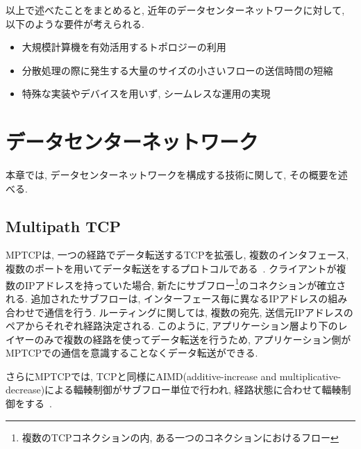 \documentclass[11pt, a4paper, twocolumn]{jsarticle}
\begin{document}
以上で述べたことをまとめると, 近年のデータセンターネットワークに対して, 以下のような要件が考えられる.
\begin{itemize}
  \item 大規模計算機を有効活用するトポロジーの利用
  \item 分散処理の際に発生する大量のサイズの小さいフローの送信時間の短縮
  \item 特殊な実装やデバイスを用いず, シームレスな運用の実現
\end{itemize}

\section{データセンターネットワーク}
\label{sec:datacenter}
本章では, データセンターネットワークを構成する技術に関して, その概要を述べる.
\subsection{Multipath TCP}
MPTCPは, 一つの経路でデータ転送するTCPを拡張し, 複数のインタフェース,
複数のポートを用いてデータ転送をするプロトコルである~\cite{mptcp}.
クライアントが複数のIPアドレスを持っていた場合, 新たにサブフロー\footnote{複数のTCPコネクションの内,
ある一つのコネクションにおけるフロー}のコネクションが確立される.
追加されたサブフローは, インターフェース毎に異なるIPアドレスの組み合わせで通信を行う.
ルーティングに関しては, 複数の宛先, 送信元IPアドレスのペアからそれぞれ経路決定される.
このように, アプリケーション層より下のレイヤーのみで複数の経路を使ってデータ転送を行うため,
アプリケーション側がMPTCPでの通信を意識することなくデータ転送ができる.

さらにMPTCPでは, TCPと同様にAIMD(additive-increase and
multiplicative-decrease)による輻輳制御がサブフロー単位で行われ, 経路状態に合わせて輻輳制御をする~\cite{cong}.
\end{document}
